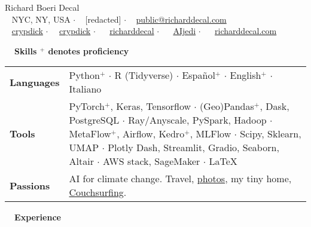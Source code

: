 \documentclass[a4paper,12pt]{article}
\newcommand{\resheading}[1]{{\vspace*{.001in} \colorbox{mygrey}{\begin{minipage}{\textwidth}{\textmd{\large \textbf{#1} \vphantom{p\^{E}}}}\end{minipage}}} }
\newcommand{\ressubheading}[4]{
    \textbf{#1} \hfill #2\\
    \textit{#3} \hfill #4 \\}
\begin{document}
    \begin{center}
    {\Huge Richard Boeri Decal}
        \\
        {\small \faMapMarker~ NYC, NY, USA $\cdot$ \faPhone~ [redacted] $\cdot$ \faEnvelope~ \href{mailto:public@richarddecal.com}{public@richarddecal.com}  \\ \faGithubAlt~ \href{https://github.com/crypdick}{crypdick} $\cdot$~\faStackOverflow~  \href{https://stackoverflow.com/users/4212158/crypdick}{crypdick} $\cdot$ ~\faLinkedin~ \href{https://www.linkedin.com/in/richarddecal/}{richarddecal}  $\cdot$ ~\faTwitter~ \href{https://twitter.com/AIjedi}{AIjedi}  $\cdot$ ~\faHome~  \href{http://www.richarddecal.com}{richarddecal.com}}
    \end{center}

    \resheading{~~Skills \hfill {\small$^+$ denotes proficiency}}
    \vspace{-1em}
    \begin{tabularx}{\textwidth}{p{2.1cm}>{\arraybackslash}X}
        \bfseries{Languages} & Python$^+$ $\cdot$ R (Tidyverse) $\cdot$ Espa\~nol$^+$ $\cdot$ English$^+$ $\cdot$ Italiano                                                                                                                                                                                                   \\
        \bfseries{Tools}     & PyTorch$^+$, Keras, Tensorflow  $\cdot$ (Geo)Pandas$^+$, Dask, PostgreSQL $\cdot$ Ray/Anyscale, PySpark, Hadoop $\cdot$ MetaFlow$^+$, Airflow, Kedro$^+$, MLFlow $\cdot$ Scipy, Sklearn, UMAP $\cdot$ Plotly Dash, Streamlit, Gradio, Seaborn, Altair  $\cdot$ AWS stack, SageMaker $\cdot$  \LaTeX \\
        \bfseries{Passions}  & AI for climate change. Travel, \href{https://www.flickr.com/photos/richarddecal/sets/72157640025469005/}{photos}, my tiny home, \href{https://www.couchsurfing.com/people/rovingrichard/references}{Couchsurfing}.
    \end{tabularx}


    \resheading{~~Experience}
    \vspace{-1em}
\end{document}
